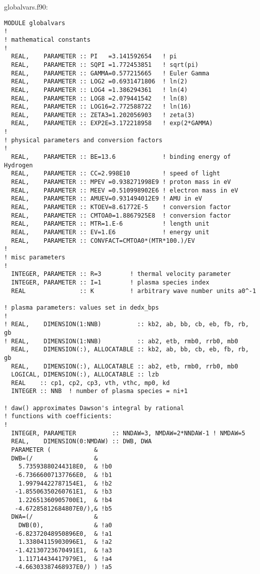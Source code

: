 \documentclass[preprint,12pt,eqsecnum,nofootinbib,amsmath,amssymb]{revtex4}
\begin{document}
\vskip1cm
{
\noindent
globalvars.f90:
\baselineskip12pt
\begin{verbatim}
MODULE globalvars
!
! mathematical constants
!
  REAL,    PARAMETER :: PI   =3.141592654   ! pi
  REAL,    PARAMETER :: SQPI =1.772453851   ! sqrt(pi)
  REAL,    PARAMETER :: GAMMA=0.577215665   ! Euler Gamma
  REAL,    PARAMETER :: LOG2 =0.6931471806  ! ln(2)
  REAL,    PARAMETER :: LOG4 =1.386294361   ! ln(4)
  REAL,    PARAMETER :: LOG8 =2.079441542   ! ln(8)
  REAL,    PARAMETER :: LOG16=2.772588722   ! ln(16)
  REAL,    PARAMETER :: ZETA3=1.202056903   ! zeta(3)
  REAL,    PARAMETER :: EXP2E=3.172218958   ! exp(2*GAMMA)
!
! physical parameters and conversion factors
!
  REAL,    PARAMETER :: BE=13.6             ! binding energy of Hydrogen
  REAL,    PARAMETER :: CC=2.998E10         ! speed of light
  REAL,    PARAMETER :: MPEV =0.938271998E9 ! proton mass in eV
  REAL,    PARAMETER :: MEEV =0.510998902E6 ! electron mass in eV
  REAL,    PARAMETER :: AMUEV=0.931494012E9 ! AMU in eV
  REAL,    PARAMETER :: KTOEV=8.61772E-5    ! conversion factor
  REAL,    PARAMETER :: CMTOA0=1.8867925E8  ! conversion factor
  REAL,    PARAMETER :: MTR=1.E-6           ! length unit
  REAL,    PARAMETER :: EV=1.E6             ! energy unit
  REAL,    PARAMETER :: CONVFACT=CMTOA0*(MTR*100.)/EV
!
! misc parameters
!
  INTEGER, PARAMETER :: R=3        ! thermal velocity parameter
  INTEGER, PARAMETER :: I=1        ! plasma species index
  REAL               :: K          ! arbitrary wave number units a0^-1 

! plasma parameters: values set in dedx_bps
!
! REAL,    DIMENSION(1:NNB)          :: kb2, ab, bb, cb, eb, fb, rb, gb
! REAL,    DIMENSION(1:NNB)          :: ab2, etb, rmb0, rrb0, mb0
  REAL,    DIMENSION(:), ALLOCATABLE :: kb2, ab, bb, cb, eb, fb, rb, gb
  REAL,    DIMENSION(:), ALLOCATABLE :: ab2, etb, rmb0, rrb0, mb0
  LOGICAL, DIMENSION(:), ALLOCATABLE :: lzb
  REAL    :: cp1, cp2, cp3, vth, vthc, mp0, kd
  INTEGER :: NNB  ! number of plasma species = ni+1

! daw() approximates Dawson's integral by rational
! functions with coefficients:
!
  INTEGER, PARAMETER          :: NNDAW=3, NMDAW=2*NNDAW-1 ! NMDAW=5
  REAL,    DIMENSION(0:NMDAW) :: DWB, DWA
  PARAMETER (            &
  DWB=(/                 &
    5.73593880244318E0,  & !b0
   -6.73666007137766E0,  & !b1
    1.99794422787154E1,  & !b2
   -1.85506350260761E1,  & !b3
    1.22651360905700E1,  & !b4
   -4.67285812684807E0/),& !b5
  DWA=(/                 &
    DWB(0),              & !a0
   -6.82372048950896E0,  & !a1
    1.33804115903096E1,  & !a2
   -1.42130723670491E1,  & !a3
    1.11714434417979E1,  & !a4
   -4.66303387468937E0/) ) !a5


\end{verbatim}}
\end{document}
